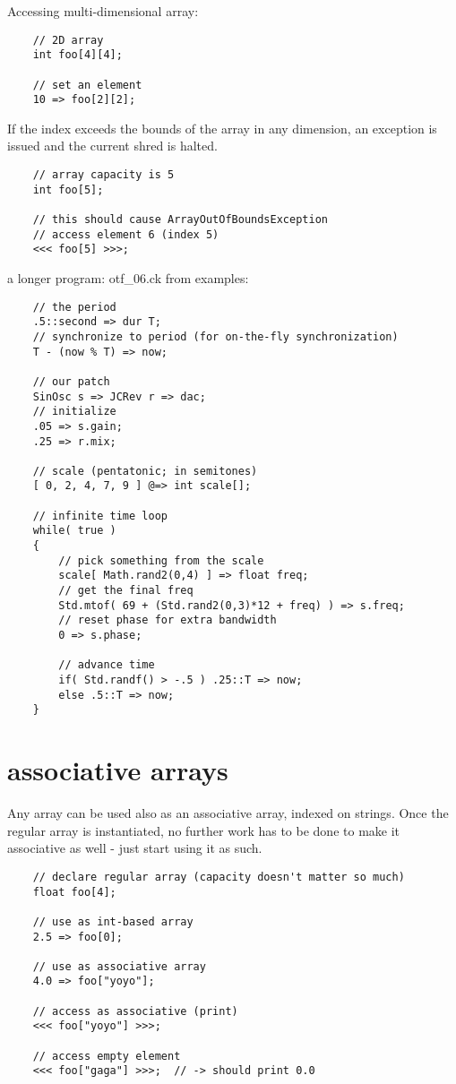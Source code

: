 Accessing multi-dimensional array:
\begin{verbatim}
    // 2D array
    int foo[4][4];

    // set an element
    10 => foo[2][2];
\end{verbatim}

If the index exceeds the bounds of the array in any dimension, an exception is issued and the current shred is halted.
\begin{verbatim}
    // array capacity is 5
    int foo[5];

    // this should cause ArrayOutOfBoundsException
    // access element 6 (index 5)
    <<< foo[5] >>>;
\end{verbatim}

a longer program: otf\_06.ck from examples:
\begin{verbatim}
    // the period
    .5::second => dur T;
    // synchronize to period (for on-the-fly synchronization)
    T - (now % T) => now;

    // our patch
    SinOsc s => JCRev r => dac;
    // initialize
    .05 => s.gain;
    .25 => r.mix;

    // scale (pentatonic; in semitones)
    [ 0, 2, 4, 7, 9 ] @=> int scale[];

    // infinite time loop
    while( true )
    {
        // pick something from the scale
        scale[ Math.rand2(0,4) ] => float freq;
        // get the final freq
        Std.mtof( 69 + (Std.rand2(0,3)*12 + freq) ) => s.freq;
        // reset phase for extra bandwidth
        0 => s.phase;

        // advance time
        if( Std.randf() > -.5 ) .25::T => now;
        else .5::T => now;
    }
\end{verbatim}
 

\section{associative arrays}

Any array can be used also as an associative array, indexed on strings. Once the regular array is instantiated, no further work has to be done to make it associative as well - just start using it as such.
\begin{verbatim}
    // declare regular array (capacity doesn't matter so much)
    float foo[4];

    // use as int-based array
    2.5 => foo[0];

    // use as associative array
    4.0 => foo["yoyo"];

    // access as associative (print)
    <<< foo["yoyo"] >>>;

    // access empty element
    <<< foo["gaga"] >>>;  // -> should print 0.0
\end{verbatim}

